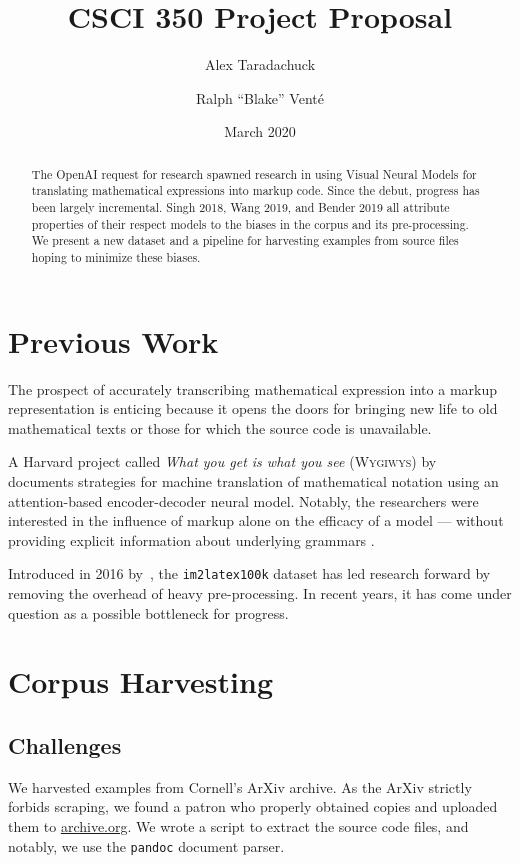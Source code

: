 \documentclass[]{article}
\title{\TeXNet{} \textbar{} CSCI 350 Project Proposal}
\author{Alex Taradachuck \and Ralph ``Blake'' Vent\'{e}}
\date{March 2020}
\begin{document}
\maketitle

\begin{abstract}
  The OpenAI request for research spawned research in using Visual Neural Models
  for translating mathematical expressions into markup code. Since the debut,
  progress has been largely incremental. Singh 2018, Wang 2019, and Bender 2019
  all attribute properties of their respect models to the biases in the corpus
  and its pre-processing. We present a new dataset and a pipeline for harvesting
  examples from source files hoping to minimize these biases.
\end{abstract}

\section{Previous Work}

The prospect of accurately transcribing mathematical expression into a markup
representation is enticing because it opens the doors for bringing new life to
old mathematical texts or those for which the source code is unavailable.

A Harvard project called \emph{What you get is what you see} (\textsc{Wygiwys})
by~\cite{deng2016you} documents strategies for machine translation of
mathematical notation using an attention-based encoder-decoder neural model.
Notably, the researchers were interested in the influence of markup alone on the
efficacy of a model --- without providing explicit information about underlying
grammars \parencite[1]{deng2016you}.

Introduced in 2016 by~\cite{deng2016you}, the \texttt{im2latex100k} dataset has
led research forward by removing the overhead of heavy pre-processing. In recent
years, it has come under question as a possible bottleneck for progress.

\section{Corpus Harvesting}

\subsection{Challenges}

We harvested examples from Cornell's ArXiv archive. As the ArXiv strictly
forbids scraping, we found a patron who properly obtained copies and uploaded
them to \url{archive.org}. We wrote a script to extract the source code files,
and notably, we use the \texttt{pandoc} document parser.
\end{document}
